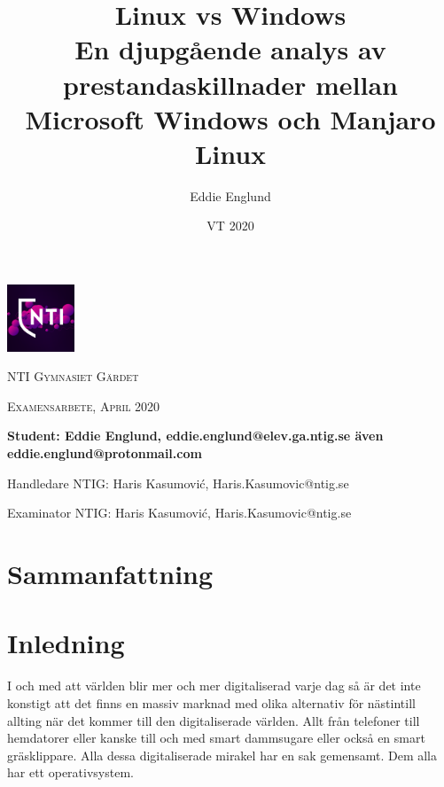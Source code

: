 \documentclass[12pt, a4paper]{report}
\author{Eddie Englund}
\title{Linux vs Windows\\[0.2em]\smaller{}En djupgående analys av prestandaskillnader mellan Microsoft Windows och Manjaro Linux}
\date{VT 2020}
\begin{document}
\begin{titlepage}

    \maketitle

    \begin{center}

    
        \includegraphics[width=0.15\textwidth]{nti}\par\vspace{1cm}

    {\scshape\LARGE NTI Gymnasiet Gärdet \par}
    \vspace{1cm}
    {\scshape\Large Examensarbete, April 2020\par}
	\vspace{1.5cm}
    \textbf{
    Student: Eddie Englund, eddie.englund@elev.ga.ntig.se även eddie.englund@protonmail.com}
    \vspace{0.2cm}

    Handledare NTIG: Haris Kasumović, Haris.Kasumovic@ntig.se
    \vspace{0.1cm}

    Examinator NTIG: Haris Kasumović, Haris.Kasumovic@ntig.se
    
    \end{center}
\end{titlepage}


\section{Sammanfattning}\label{sum}

    \begin{abstract}

    \end{abstract}

\tableofcontents

\vspace{3cm}

    
\section{Inledning}
 
 
   I och med att världen blir mer och mer digitaliserad varje dag så är det inte konstigt att det finns en massiv marknad med olika alternativ för nästintill allting när det kommer till den digitaliserade världen. Allt från telefoner till hemdatorer eller kanske till och med smart dammsugare eller också en smart gräsklippare. Alla dessa digitaliserade mirakel har en sak gemensamt. Dem alla har ett operativsystem.
 
\end{document}
